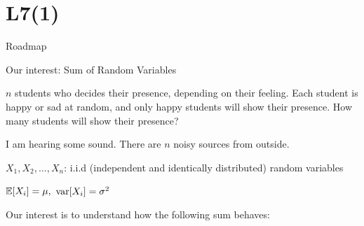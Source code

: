 \section{L7(1)}
\begin{frame}{Roadmap}

\plitemsep 0.15in

\bce[(1)]

\item {}
\item {}
\ece

\end{frame}


\begin{frame}{Our interest: Sum of Random Variables}

\plitemsep 0.1in

\bci

\item<1->  $n$ students who decides their presence, depending on their feeling. Each student is happy or sad at random, and only happy students will show their presence. How many students will show their presence?

\item<2->  I am hearing some sound. There are $n$ noisy sources from outside.

\bigskip

\item<3-> $X_1, X_2, \ldots, X_n$: i.i.d (independent and identically distributed) random variables

\item<4-> $\mathbb{E}[ X_i ] = \mu,$ $\text{var}[ X_i ] = \sigma^2$

\item<5-> Our interest is to understand how the following sum behaves:
\eci

\end{frame}

